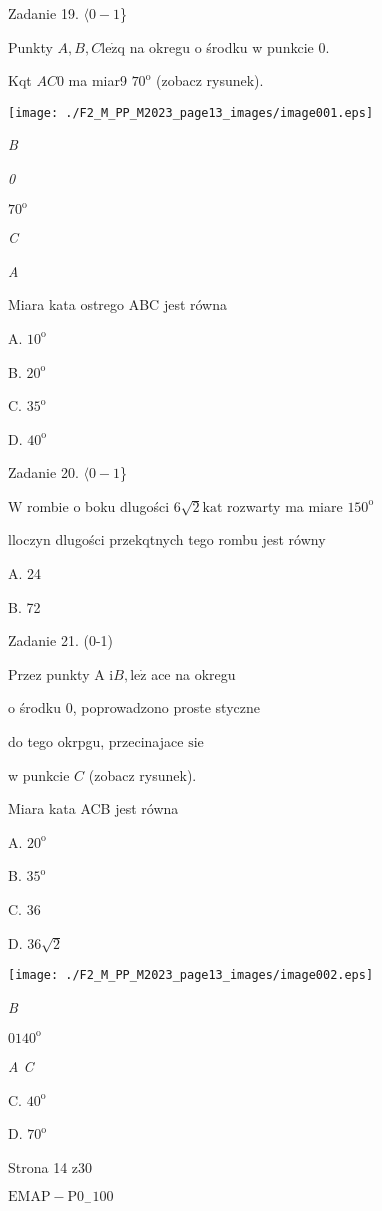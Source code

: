 \documentclass[a4paper,12pt]{article}
\begin{document}
Zadanie 19. $\langle 0-1$\}

Punkty $A, B, C \mathrm{l}\mathrm{e}\dot{\mathrm{z}}\mathrm{q}$ na okregu o środku w punkcie 0.

Kqt $AC0$ ma miar9 $70^{\mathrm{o}}$ (zobacz rysunek).
\begin{center}
\texttt{[image: ./F2\_M\_PP\_M2023\_page13\_images/image001.eps]}
\end{center}
{\it B}

{\it 0}

$70^{\mathrm{o}}$

{\it C}

{\it A}

Miara kata ostrego ABC jest równa

A. $10^{\mathrm{o}}$

B. $20^{\mathrm{o}}$

C. $35^{\mathrm{o}}$

D. $40^{\mathrm{o}}$

Zadanie 20. $\langle 0-1$\}

$\mathrm{W}$ rombie o boku dlugości $6\sqrt{2} \mathrm{k}\mathrm{a}\mathrm{t}$ rozwarty ma miare $150^{\mathrm{o}}$

lloczyn dlugości przekqtnych tego rombu jest równy

A. 24

B. 72

Zadanie 21. (0-1)

Przez punkty A $\mathrm{i} B, \mathrm{l}\mathrm{e}\dot{\mathrm{z}}$ ace na okregu

o środku 0, poprowadzono proste styczne

do tego okrpgu, przecinajace $\mathrm{s}\mathrm{i}\mathrm{e}$

w punkcie $C$ (zobacz rysunek).

Miara kata ACB jest równa

A. $20^{\mathrm{o}}$

B. $35^{\mathrm{o}}$

C. 36

D. $36\sqrt{2}$
\begin{center}
\texttt{[image: ./F2\_M\_PP\_M2023\_page13\_images/image002.eps]}
\end{center}
{\it B}

$0140^{\mathrm{o}}$

{\it A  C}

C. $40^{\mathrm{o}}$

D. $70^{\mathrm{o}}$

Strona 14 z30

$\mathrm{E}\mathrm{M}\mathrm{A}\mathrm{P}-\mathrm{P}0_{-}100$
\end{document}
